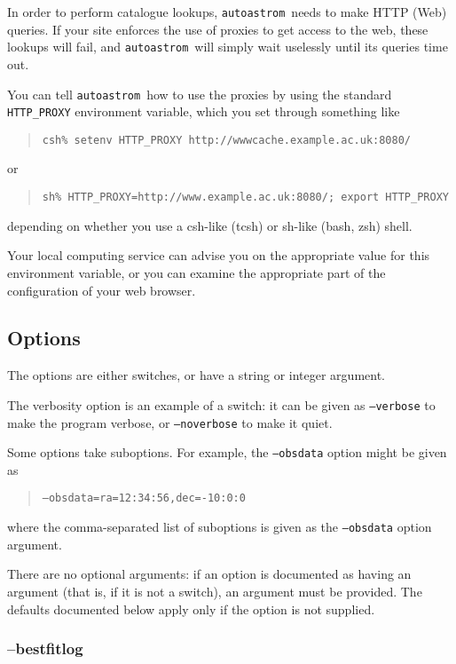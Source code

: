\documentclass[twoside,11pt]{article}
\newcommand{\xlabel}[1]{}
\newcommand{\autoastrom}{\texttt{autoastrom}}
\begin{document}
In order to perform catalogue lookups, \autoastrom\ needs to make HTTP (Web)
queries.  If your site enforces the use of proxies to get access to the web,
these lookups will fail, and \autoastrom\ will simply wait uselessly until its
queries time out.

You can tell \autoastrom\ how to use the proxies by using the standard
\texttt{HTTP\_PROXY} environment variable, which you set through something
like

\begin{quote}
  \texttt{csh\% setenv HTTP\_PROXY http://wwwcache.example.ac.uk:8080/}
\end{quote}
or
\begin{quote}
  \texttt{sh\% HTTP\_PROXY=http://www.example.ac.uk:8080/; export HTTP\_PROXY}
\end{quote}
depending on whether you use a csh-like (tcsh) or sh-like (bash, zsh) shell.

Your local computing service can advise you on the appropriate value for this
environment variable, or you can examine the appropriate part of the
configuration of your web browser.

\subsection{\xlabel{sb_options}Options\label{sb:options}}

The options are either switches, or have a string or integer argument.

The verbosity option is an example of a switch: it can be given as
\texttt{--verbose} to make the program verbose, or \texttt{--noverbose} to
make it quiet.

Some options take suboptions.  For example, the \texttt{--obsdata} option
might be given as

\begin{quote}
  \texttt{--obsdata=ra=12:34:56,dec=-10:0:0}
\end{quote}

where the comma-separated list of suboptions is given as the
\texttt{--obsdata} option argument.

There are no optional arguments: if an option is documented as having an
argument (that is, if it is not a switch), an argument must be provided.  The
defaults documented below apply only if the option is not supplied.

\subsubsection{\xlabel{sb_options_bestfitlog}--bestfitlog\label{sb:options:bestfitlog}}
\end{document}
